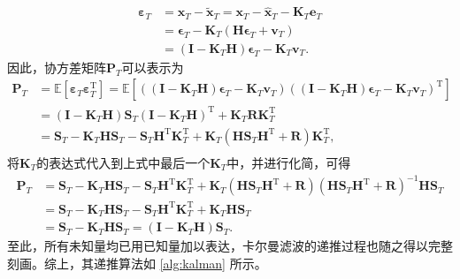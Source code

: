 \[
    \begin{split}
        \bm{\varepsilon}_T & = \bm{x}_T - \tilde{\bm{x}}_T = \bm{x}_T - \hat{\bm{x}}_T - \mathbf{K}_T \bm{e}_T \\
                           & = \bm{\epsilon}_T - \mathbf{K}_T (\mathbf{H} \bm{\epsilon}_T + \bm{v}_T)          \\
                           & = (\mathbf{I} - \mathbf{K}_T \mathbf{H}) \bm{\epsilon}_T - \mathbf{K}_T \bm{v}_T.
    \end{split}
\]
因此，协方差矩阵\( \mathbf{P}_T \)可以表示为
\[
    \begin{split}
        \mathbf{P}_T & = \mathbb{E}[\bm{\varepsilon}_T \bm{\varepsilon}_T^{\mathrm{T}}] = \mathbb{E}[\left( (\mathbf{I} - \mathbf{K}_T \mathbf{H}) \bm{\epsilon}_T - \mathbf{K}_T \bm{v}_T \right) \left( (\mathbf{I} - \mathbf{K}_T \mathbf{H}) \bm{\epsilon}_T - \mathbf{K}_T \bm{v}_T \right)^{\mathrm{T}}] \\
                     & = (\mathbf{I} - \mathbf{K}_T \mathbf{H}) \mathbf{S}_T (\mathbf{I} - \mathbf{K}_T \mathbf{H})^{\mathrm{T}} + \mathbf{K}_T \mathbf{R} \mathbf{K}_T^{\mathrm{T}}                                                                                                                           \\
                     & = \mathbf{S}_T - \mathbf{K}_T \mathbf{H} \mathbf{S}_T - \mathbf{S}_T \mathbf{H}^{\mathrm{T}} \mathbf{K}_T^{\mathrm{T}} + \mathbf{K}_T (\mathbf{H} \mathbf{S}_T \mathbf{H}^{\mathrm{T}} + \mathbf{R}) \mathbf{K}_T^{\mathrm{T}},                                                         \\
    \end{split}
\]
将\( \mathbf{K}_T \)的表达式代入到上式中最后一个\( \mathbf{K}_T \)中，并进行化简，可得
\[
    \begin{split}
        \mathbf{P}_T & = \mathbf{S}_T - \mathbf{K}_T \mathbf{H} \mathbf{S}_T - \mathbf{S}_T \mathbf{H}^{\mathrm{T}} \mathbf{K}_T^{\mathrm{T}} + \mathbf{K}_T (\mathbf{H} \mathbf{S}_T \mathbf{H}^{\mathrm{T}} + \mathbf{R})  \left( \mathbf{H} \mathbf{S}_T \mathbf{H}^{\mathrm{T}} + \mathbf{R} \right)^{-1}  \mathbf{H}\mathbf{S}_T \\
                     & = \mathbf{S}_T - \mathbf{K}_T \mathbf{H} \mathbf{S}_T - \mathbf{S}_T \mathbf{H}^{\mathrm{T}} \mathbf{K}_T^{\mathrm{T}} + \mathbf{K}_T \mathbf{H} \mathbf{S}_T                                                                                                                                                  \\
                     & = \mathbf{S}_T - \mathbf{K}_T \mathbf{H} \mathbf{S}_T = (\mathbf{I} - \mathbf{K}_T \mathbf{H}) \mathbf{S}_T.
    \end{split}
\]
至此，所有未知量均已用已知量加以表达，卡尔曼滤波的递推过程也随之得以完整刻画。综上，其递推算法如 \cref{alg:kalman} 所示。

